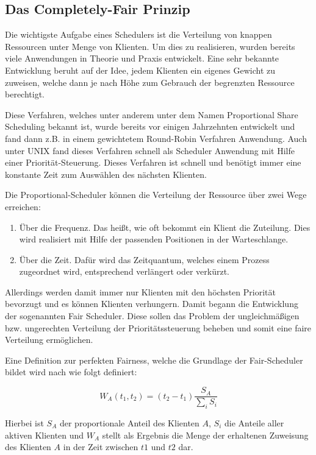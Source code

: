 \subsection{Das \glqq Completely-Fair\grqq{} Prinzip}
Die wichtigste Aufgabe eines Schedulers ist die Verteilung von knappen Ressourcen unter Menge von Klienten. 
Um dies zu realisieren, wurden bereits viele Anwendungen in Theorie und Praxis entwickelt.
Eine sehr bekannte Entwicklung beruht auf der Idee, jedem Klienten ein eigenes Gewicht zu zuweisen, welche dann je nach Höhe zum Gebrauch der begrenzten Ressource berechtigt.

Diese Verfahren, welches unter anderem unter dem Namen \glqq Proportional Share Scheduling\grqq{} bekannt ist, wurde bereits vor einigen Jahrzehnten entwickelt und fand dann z.B. in einem gewichtetem Round-Robin Verfahren Anwendung. Auch unter UNIX fand dieses Verfahren schnell als Scheduler Anwendung mit Hilfe einer Priorität-Steuerung. Dieses Verfahren ist schnell und benötigt immer eine konstante Zeit zum Auswählen des nächsten Klienten. 

Die Proportional-Scheduler können die Verteilung der Ressource über zwei Wege erreichen:

\begin{enumerate}
	\item Über die Frequenz. Das heißt, wie oft bekommt ein Klient die Zuteilung. Dies wird realisiert mit Hilfe der passenden Positionen in der Warteschlange.
	\item Über die Zeit. Dafür wird das Zeitquantum, welches einem Prozess zugeordnet wird, entsprechend verlängert oder verkürzt.
\end{enumerate}

Allerdings werden damit immer nur Klienten mit den höchsten Priorität bevorzugt und es können Klienten \glqq verhungern\grqq{}.
Damit begann die Entwicklung der sogenannten \glqq Fair Scheduler\grqq{}. Diese sollen das Problem der ungleichmäßigen bzw. ungerechten Verteilung der Prioritätssteuerung beheben und somit eine \glqq faire\grqq{} Verteilung ermöglichen. 

Eine Definition zur perfekten Fairness, welche die Grundlage der Fair-Scheduler bildet wird nach \cite{pdf Frau Ma} wie folgt definiert:

\begin{equation}
W_A(t_1,t_2) = (t_2 - t_1) \frac{S_A}{\sum_i S_i}
\label{eq:perfect_fairness}
\end{equation}

Hierbei ist $S_A$ der proportionale Anteil des Klienten $A$, $S_i$ die Anteile aller aktiven Klienten und $W_A$ stellt als Ergebnis die Menge der erhaltenen Zuweisung des Klienten $A$ in der Zeit zwischen $t1$ und $t2$ dar.

